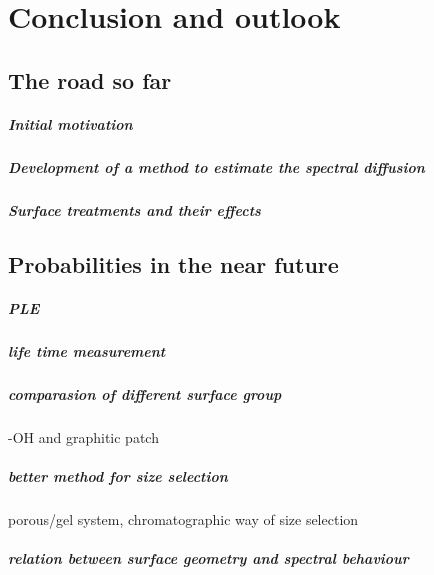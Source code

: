 \chapter{Conclusion and outlook} %

\label{Chapter3} %

\section{The road so far}

\paragraph{Initial motivation}

\paragraph{Development of a method to estimate the spectral diffusion}

\paragraph{Surface treatments and their effects}

\section{ Probabilities in the near future}

\paragraph{PLE}

\paragraph{life time measurement}

\paragraph{comparasion of different surface group}
-OH and graphitic patch
\paragraph{better method for size selection}
porous/gel system, chromatographic way of size selection
\paragraph{relation between surface geometry and spectral behaviour}

